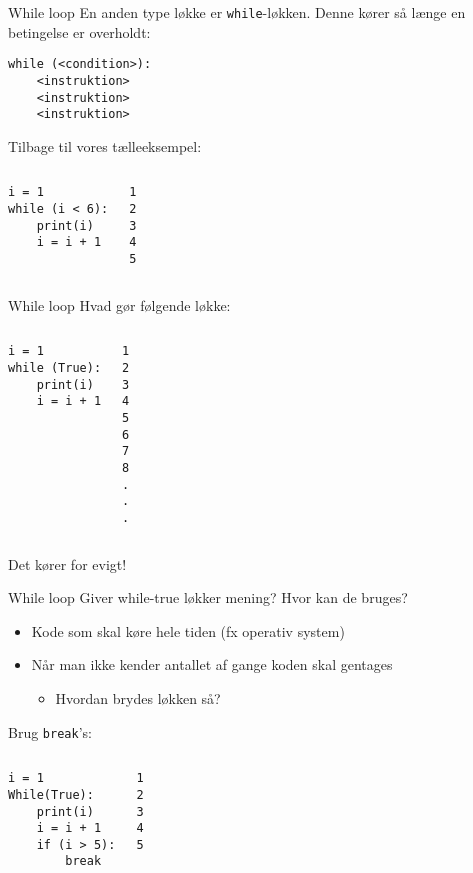 \begin{frame}[fragile]{While loop}
	En anden type løkke er \texttt{while}-løkken. Denne kører så længe en betingelse er overholdt:
		\begin{lstlisting}[style=python]
while (<condition>):
	<instruktion>
	<instruktion>
	<instruktion>
		\end{lstlisting}
	Tilbage til vores tælleeksempel:
	\begin{columns}
		\begin{lstlisting}[style=python]
i = 1
while (i < 6):
	print(i)
	i = i + 1
		\end{lstlisting}
		\begin{lstlisting}[style=python]
1
2
3
4
5
		\end{lstlisting}
	\end{columns}
\end{frame}

\begin{frame}[fragile]{While loop}
	Hvad gør følgende løkke:
	\begin{columns}
		\column{0.4\textwidth}
		\begin{lstlisting}[style=python]
i = 1
while (True):
	print(i)
	i = i + 1
		\end{lstlisting}
		\pause
		\column{0.4\textwidth}
		\begin{lstlisting}[style=python]
1
2
3
4
5
6
7
8
.
.
.
		\end{lstlisting}
	\end{columns}
	Det kører for evigt!
\end{frame}


\begin{frame}[fragile]{While loop}
	Giver while-true løkker mening? Hvor kan de bruges?
	\pause
	\begin{itemize}
		\item Kode som skal køre hele tiden (fx operativ system)
		\item Når man ikke kender antallet af gange koden skal gentages
		\begin{itemize}
			\item Hvordan brydes løkken så?
		\end{itemize}
	\end{itemize}
	\pause
	Brug \texttt{break}'s:
	\begin{columns}
		\begin{lstlisting}[style=python]
i = 1
While(True):
	print(i)
	i = i + 1
	if (i > 5):
		break
		\end{lstlisting}
		\pause
		\begin{lstlisting}[style=python]
1
2
3
4
5
		\end{lstlisting}
	\end{columns}
\end{frame}

